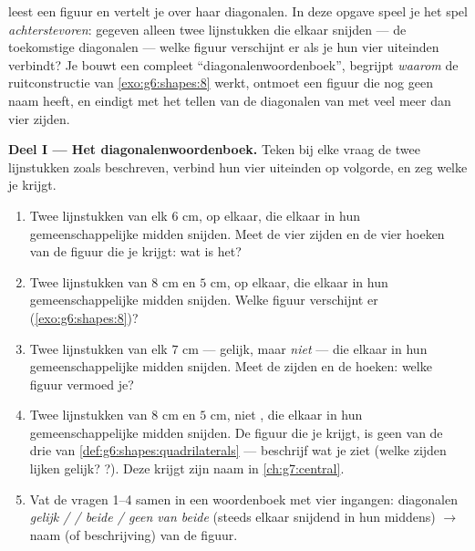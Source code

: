 \begin{problem}
\label{pb:g6:shapes:1}
 leest een figuur en vertelt je over haar
diagonalen. In deze opgave speel je het spel \emph{achterstevoren}: gegeven
alleen twee lijnstukken die elkaar snijden --- de toekomstige diagonalen ---
welke figuur verschijnt er als je hun vier uiteinden verbindt? Je bouwt een
compleet ``diagonalenwoordenboek'', begrijpt \emph{waarom} de ruitconstructie
van \cref{exo:g6:shapes:8} werkt, ontmoet een figuur die nog geen naam heeft,
en eindigt met het tellen van de diagonalen van  met veel meer dan
vier zijden.

\medskip
\noindent\textbf{Deel I --- Het diagonalenwoordenboek.}
Teken bij elke vraag de twee lijnstukken zoals beschreven, verbind hun vier
uiteinden op volgorde, en zeg welke  je krijgt.
\begin{enumerate}
  \item Twee lijnstukken van elk $6$ cm,  op elkaar, die elkaar in hun
        gemeenschappelijke midden snijden. Meet de vier zijden en de vier
        hoeken van de figuur die je krijgt: wat is het?
  \item Twee lijnstukken van $8$ cm en $5$ cm,  op elkaar, die elkaar
        in hun gemeenschappelijke midden snijden. Welke figuur verschijnt er
        (\cref{exo:g6:shapes:8})?
  \item Twee lijnstukken van elk $7$ cm --- gelijk, maar \emph{niet} 
        --- die elkaar in hun gemeenschappelijke midden snijden. Meet de zijden
        en de hoeken: welke figuur vermoed je?
  \item Twee lijnstukken van $8$ cm en $5$ cm, niet , die elkaar in
        hun gemeenschappelijke midden snijden. De figuur die je krijgt, is geen
        van de drie van \cref{def:g6:shapes:quadrilaterals} --- beschrijf wat
        je ziet (welke zijden lijken gelijk? ?). Deze  krijgt
        zijn naam in \cref{ch:g7:central}.
  \item Vat de vragen 1--4 samen in een woordenboek met vier ingangen:
        diagonalen \emph{gelijk /  / beide / geen van beide} (steeds
        elkaar snijdend in hun middens) $\rightarrow$ naam (of beschrijving)
        van de figuur.
\end{enumerate}


\end{problem}
